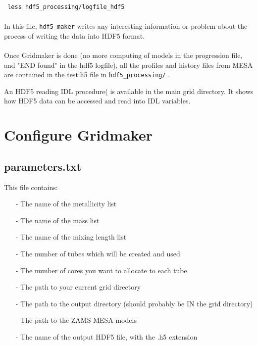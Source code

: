 \documentclass{report}
\begin{document}
\begin{verbatim} less hdf5_processing/logfile_hdf5
\end{verbatim}

\paragraph{} In this file, \verb+hdf5_maker+ writes any interesting information or problem about the process of writing the data into HDF5 format.

\paragraph{} Once Gridmaker is done (no more computing of models in the progression file, and "END found" in the hdf5 logfile), all the profiles and history files from MESA are contained in the test.h5 file in \verb+hdf5_processing/+ . 


An HDF5 reading IDL procedure(  is available in the main grid directory. It
shows how HDF5 data can be accessed and read into IDL variables.

\section{Configure Gridmaker}

\subsection{parameters.txt}

This file contains:
\begin{itemize}
\item[-] The name of the metallicity list
\item[-] The name of the mass list
\item[-] The name of the mixing length list
\item[-] The number of tubes which will be created and used
\item[-] The number of cores you want to allocate to each tube
\item[-] The path to your current grid directory
\item[-] The path to the output directory (should probably be IN the grid directory)
\item[-] The path to the ZAMS MESA models
\item[-] The name of the output HDF5 file, with the .h5 extension
\end{itemize}
\end{document}
